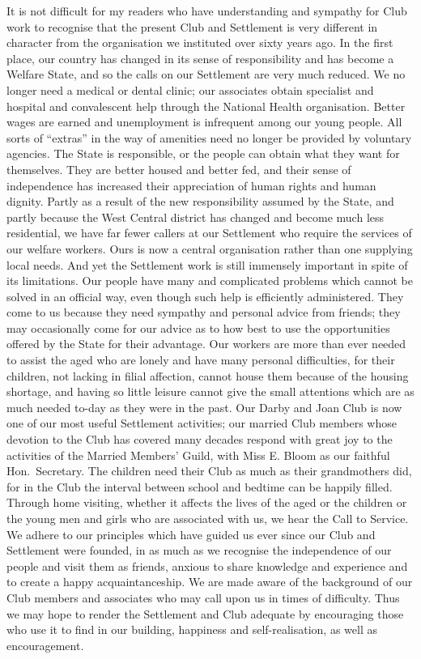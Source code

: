 It is not difficult for my readers who have understanding
and sympathy for Club work to recognise that
the present Club and Settlement is very different in
character from the organisation we instituted over sixty
years ago. In the first place, our country has changed in
its sense of responsibility and has become a Welfare
State, and so the calls on our Settlement are very much
reduced. We no longer need a medical or dental clinic;
our associates obtain specialist and hospital and convalescent
help through the National Health organisation.
Better wages are earned and unemployment is infrequent
among our young people. All sorts of “extras” in the
way of amenities need no longer be provided by
voluntary agencies. The State is responsible, or the
people can obtain what they want for themselves. They
are better housed and better fed, and their sense of
independence has increased their appreciation of human
rights and human dignity. Partly as a result of the new
responsibility assumed by the State, and partly because
the West Central district has changed and become much
less residential, we have far fewer callers at our Settlement
who require the services of our welfare workers.
Ours is now a central organisation rather than one
supplying local needs. And yet the Settlement work is
still immensely important in spite of its limitations. Our
people have many and complicated problems which
cannot be solved in an official way, even though such
help is efficiently administered. They come to us
because they need sympathy and personal advice from
friends; they may occasionally come for our advice as
to how best to use the opportunities offered by the State
for their advantage. Our workers are more than ever
needed to assist the aged who are lonely and have many
personal difficulties, for their children, not lacking in
filial affection, cannot house them because of the housing
shortage, and having so little leisure cannot give the
small attentions which are as much needed to-day as they
were in the past. Our Darby and Joan Club is now one
of our most useful Settlement activities; our married Club
members whose devotion to the Club has covered many
decades respond with great joy to the activities of the
Married Members’ Guild, with Miss E. Bloom as our
faithful Hon.\ Secretary. The children need their Club
as much as their grandmothers did, for in the Club the
interval between school and bedtime can be happily filled.
Through home visiting, whether it affects the lives
of the aged or the children or the young men and girls
who are associated with us, we hear the Call to Service.
We adhere to our principles which have guided us ever
since our Club and Settlement were founded, in as much
as we recognise the independence of our people and visit
them as friends, anxious to share knowledge and
experience and to create a happy acquaintanceship.
We are made aware of the background of our Club
members and associates who may call upon us in times
of difficulty. Thus we may hope to render the Settlement
and Club adequate by encouraging those who use it to
find in our building, happiness and self-realisation, as
well as encouragement.

